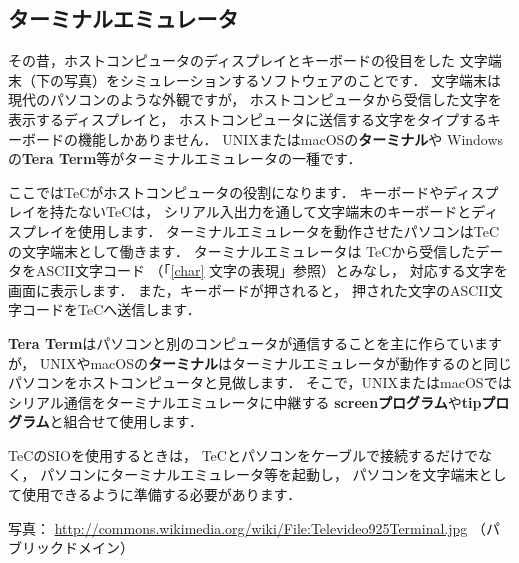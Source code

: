 \newpage
\begin{framed}
\subsection*{ターミナルエミュレータ}\label{terminal}{\small
その昔，ホストコンピュータのディスプレイとキーボードの役目をした
文字端末（下の写真）をシミュレーションするソフトウェアのことです．
文字端末は現代のパソコンのような外観ですが，
ホストコンピュータから受信した文字を表示するディスプレイと，
ホストコンピュータに送信する文字をタイプするキーボードの機能しかありません．
UNIXまたはmacOSの{\bf ターミナル}や
Windowsの{\bf Tera Term}等がターミナルエミュレータの一種です．

ここではTeCがホストコンピュータの役割になります．
キーボードやディスプレイを持たないTeCは，
シリアル入出力を通して文字端末のキーボードとディスプレイを使用します．
ターミナルエミュレータを動作させたパソコンはTeCの文字端末として働きます．
ターミナルエミュレータは
TeCから受信したデータをASCII文字コード
（「\ref{char} 文字の表現」参照）とみなし，
対応する文字を画面に表示します．
また，キーボードが押されると，
押された文字のASCII文字コードをTeCへ送信します．

{\bf Tera Term}はパソコンと別のコンピュータが通信することを主に作らていますが，
UNIXやmacOSの{\bf ターミナル}はターミナルエミュレータが動作するのと同じ
パソコンをホストコンピュータと見做します．
そこで，UNIXまたはmacOSではシリアル通信をターミナルエミュレータに中継する
{\bf screenプログラム}や{\bf tipプログラム}と組合せて使用します．

TeCのSIOを使用するときは，
TeCとパソコンをケーブルで接続するだけでなく，
パソコンにターミナルエミュレータ等を起動し，
パソコンを文字端末として使用できるように準備する必要があります．
\begin{center}
\end{center}
写真：
\url{http://commons.wikimedia.org/wiki/File:Televideo925Terminal.jpg}
（パブリックドメイン）
}\end{framed}

